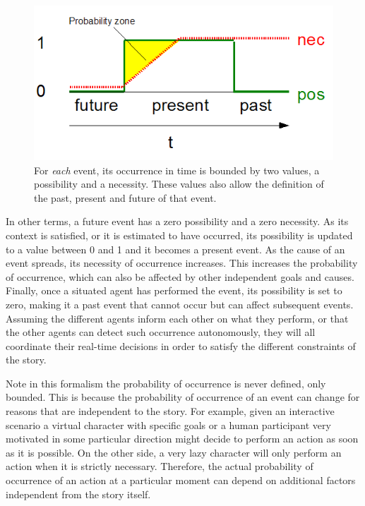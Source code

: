 \documentclass[
		twoside,openright,titlepage,numbers=noenddot,manychapters,
		headinclude,%
                footinclude=false,cleardoublepage=empty,
                BCOR=5mm,
		fontsize=11pt, %
                 enabledeprecatedfontcommands]{scrreprt}
\begin{document}
\begin{figure}[tb]
\begin{center}
\includegraphics[scale=0.5]{figures/basic_pos_nec2.png}
\caption{For \emph{each} event, its occurrence in time is bounded by two values, a possibility and a necessity. These values also allow the definition of the past, present and future of that event. }
\label{fig_basic_pos_nec}
\end{center}
\end{figure}

In other terms, a future event has a zero possibility and a zero necessity. As its context is satisfied, or it is estimated to have occurred, its possibility is updated to a value between 0 and 1 and it becomes a present event. As the cause of an event spreads, its necessity of occurrence increases. This increases the probability of occurrence, which can also be affected by other independent goals and causes. Finally, once a situated agent has performed the event, its possibility is set to zero, making it a past event that cannot occur but can affect subsequent events. Assuming the different agents inform each other on what they perform, or that the other agents can detect such occurrence autonomously, they will all coordinate their real-time decisions in order to satisfy the different constraints of the story.



Note in this formalism the probability of occurrence is never defined, only bounded. This is because the probability of occurrence of an event can change for reasons that are independent to the story. For example, given an interactive scenario a virtual character with specific goals or a human participant very motivated in some particular direction might decide to perform an action as soon as it is possible. On the other side, a very lazy character will only perform an action when it is strictly necessary. Therefore, the actual probability of occurrence of an action at a particular moment can depend on additional factors independent from the story itself.
\end{document}

